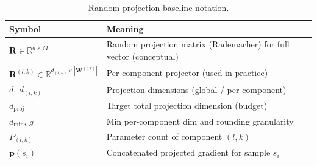 \begin{table}[H]
    \centering
    \small
    \begin{tabular}{ll}
        \textbf{Symbol} & \textbf{Meaning} \\
        \hline
        $\mathbf{R}\in\mathbb{R}^{d\times M}$ & Random projection matrix (Rademacher) for full vector (conceptual) \\
        $\mathbf{R}^{(l,k)}\in\mathbb{R}^{d_{(l,k)}\times |\mathbf{W}^{(l,k)}|}$ & Per-component projector (used in practice) \\
        $d,\ d_{(l,k)}$ & Projection dimensions (global / per component) \\
        $d_{\text{proj}}$ & Target total projection dimension (budget) \\
        $d_{\min}$, $g$ & Min per-component dim and rounding granularity \\
        $P_{(l,k)}$ & Parameter count of component $(l,k)$ \\
        $\mathbf{p}(s_i)$ & Concatenated projected gradient for sample $s_i$ \\
    \end{tabular}
    \caption{Random projection baseline notation.}
    \label{tab:nomenclature-rp}
\end{table}


